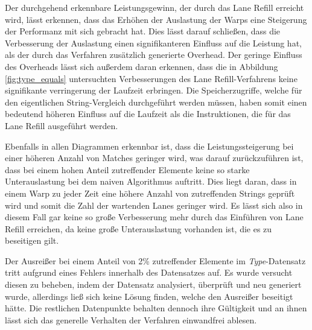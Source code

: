 Der durchgehend erkennbare Leistungsgewinn, der durch das Lane Refill erreicht wird, lässt erkennen, dass das Erhöhen der Auslastung der Warps eine Steigerung der Performanz mit sich gebracht hat.
Dies lässt darauf schließen, dass die Verbesserung der Auslastung einen signifikanteren Einfluss auf die Leistung hat, als der durch das Verfahren zusätzlich generierte Overhead.
Der geringe Einfluss des Overheads lässt sich außerdem daran erkennen, dass die in Abbildung \ref{fig:type_equals} untersuchten Verbesserungen des Lane Refill-Verfahrens keine signifikante verringerung der Laufzeit erbringen.
Die Speicherzugriffe, welche für den eigentlichen String-Vergleich durchgeführt werden müssen, haben somit einen bedeutend höheren Einfluss auf die Laufzeit als die Instruktionen, die für das Lane Refill ausgeführt werden.

Ebenfalls in allen Diagrammen erkennbar ist, dass die Leistungssteigerung bei einer höheren Anzahl von Matches geringer wird, was darauf zurückzuführen ist, dass bei einem hohen Anteil zutreffender Elemente keine so starke Unterauslastung bei dem naiven Algorithmus auftritt.
Dies liegt daran, dass in einem Warp zu jeder Zeit eine höhere Anzahl von zutreffenden Strings geprüft wird und somit die Zahl der wartenden Lanes geringer wird.
Es lässt sich also in diesem Fall gar keine so große Verbesserung mehr durch das Einführen von Lane Refill erreichen, da keine große Unterauslastung vorhanden ist, die es zu beseitigen gilt.

Der Ausreißer bei einem Anteil von 2\% zutreffender Elemente im \emph{Type}-Datensatz tritt aufgrund eines Fehlers innerhalb des Datensatzes auf.
Es wurde versucht diesen zu beheben, indem der Datensatz analysiert, überprüft und neu generiert wurde, allerdings ließ sich keine Lösung finden, welche den Ausreißer beseitigt hätte.
Die restlichen Datenpunkte behalten dennoch ihre Gültigkeit und an ihnen lässt sich das generelle Verhalten der Verfahren einwandfrei ablesen.

